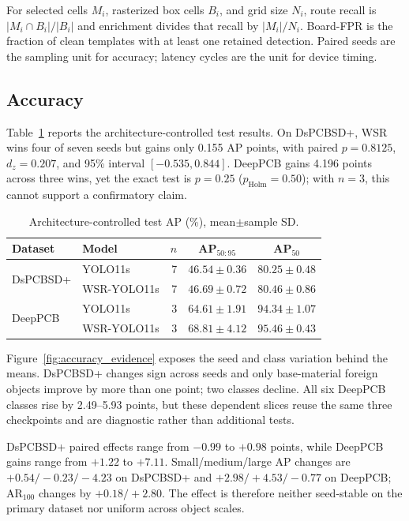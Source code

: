 \documentclass[conference]{IEEEtran}
\begin{document}
For selected cells $M_i$, rasterized box cells $B_i$, and grid size $N_i$, route recall is $|M_i\cap B_i|/|B_i|$ and enrichment divides that recall by $|M_i|/N_i$. Board-FPR is the fraction of clean templates with at least one retained detection. Paired seeds are the sampling unit for accuracy; latency cycles are the unit for device timing.

\subsection{Accuracy}
Table~\ref{tab:main} reports the architecture-controlled test results. On DsPCBSD+, WSR wins four of seven seeds but gains only 0.155 AP points, with paired $p=0.8125$, $d_z=0.207$, and 95\% interval $[-0.535,0.844]$. DeepPCB gains 4.196 points across three wins, yet the exact test is $p=0.25$ ($p_{\mathrm{Holm}}=0.50$); with $n=3$, this cannot support a confirmatory claim.

\begin{table}[t]
\centering
\caption{Architecture-controlled test AP (\%), mean$\pm$sample SD.}
\label{tab:main}
\fontsize{7.5}{8.3}\selectfont
\setlength{\tabcolsep}{3.3pt}
\begin{tabular*}{\columnwidth}{@{\extracolsep{\fill}}llrcc@{}}
\toprule
Dataset & Model & $n$ & AP$_{50:95}$ & AP$_{50}$ \\
\midrule
\multirow{2}{*}{DsPCBSD+} & YOLO11s & 7 & $46.54\pm0.36$ & $80.25\pm0.48$ \\
 & WSR-YOLO11s & 7 & $46.69\pm0.72$ & $80.46\pm0.86$ \\
\multirow{2}{*}{DeepPCB} & YOLO11s & 3 & $64.61\pm1.91$ & $94.34\pm1.07$ \\
 & WSR-YOLO11s & 3 & $68.81\pm4.12$ & $95.46\pm0.43$ \\
\bottomrule
\end{tabular*}
\end{table}

Figure~\ref{fig:accuracy_evidence} exposes the seed and class variation behind the means. DsPCBSD+ changes sign across seeds and only base-material foreign objects improve by more than one point; two classes decline. All six DeepPCB classes rise by 2.49--5.93 points, but these dependent slices reuse the same three checkpoints and are diagnostic rather than additional tests.

DsPCBSD+ paired effects range from $-0.99$ to $+0.98$ points, while DeepPCB gains range from $+1.22$ to $+7.11$. Small/medium/large AP changes are $+0.54/-0.23/-4.23$ on DsPCBSD+ and $+2.98/+4.53/-0.77$ on DeepPCB; AR$_{100}$ changes by $+0.18/+2.80$. The effect is therefore neither seed-stable on the primary dataset nor uniform across object scales.
\end{document}
